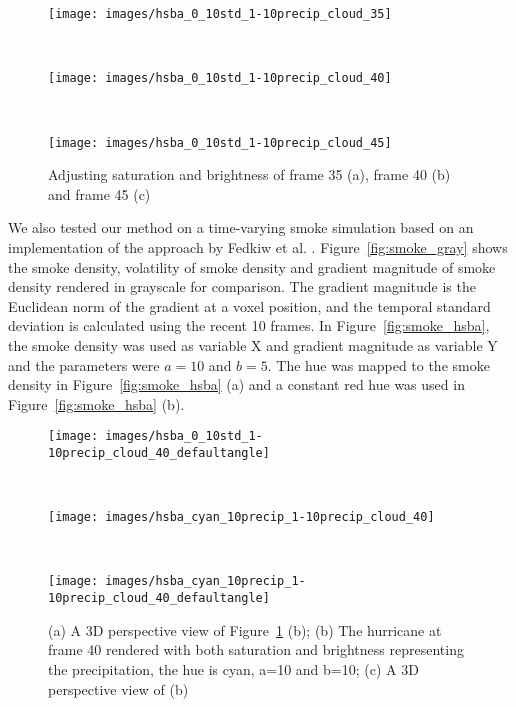 \begin{figure}
\centering
\begin{minipage}{.33\textwidth}
\texttt{[image: images/hsba\_0\_10std\_1-10precip\_cloud\_35]}
\subcaption{}
\end{minipage}~
\begin{minipage}{.33\textwidth}
\texttt{[image: images/hsba\_0\_10std\_1-10precip\_cloud\_40]}
\subcaption{}
\end{minipage}~
\begin{minipage}{.33\textwidth}
\texttt{[image: images/hsba\_0\_10std\_1-10precip\_cloud\_45]}
\subcaption{}
\end{minipage}
\caption{Adjusting saturation and brightness of frame 35 (a), frame 40 (b) and frame 45 (c)}
\label{fig:hurricane_hsba}
\end{figure}

We also tested our method on a time-varying smoke simulation based on an implementation of the approach by Fedkiw et al. \cite{fedkiw_visual_2001}. Figure~\ref{fig:smoke_gray} shows the smoke density, volatility of smoke density and gradient magnitude of smoke density rendered in grayscale for comparison.
The gradient magnitude is the Euclidean norm of the gradient at a voxel position,
and the temporal standard deviation is calculated using the recent 10 frames.
In Figure~\ref{fig:smoke_hsba}, the smoke density was used as variable X and gradient magnitude as variable Y and the parameters were $a=10$ and $b=5$.
The hue was mapped to the smoke density in Figure~\ref{fig:smoke_hsba} (a) and a constant red hue was used in Figure~\ref{fig:smoke_hsba} (b).

\begin{figure}
\centering
\begin{minipage}{.34\textwidth}
\texttt{[image: images/hsba\_0\_10std\_1-10precip\_cloud\_40\_defaultangle]}
\subcaption{}
\end{minipage}~
\begin{minipage}{.32\textwidth}
\texttt{[image: images/hsba\_cyan\_10precip\_1-10precip\_cloud\_40]}
\subcaption{}
\end{minipage}~
\begin{minipage}{.34\textwidth}
\texttt{[image: images/hsba\_cyan\_10precip\_1-10precip\_cloud\_40\_defaultangle]}
\subcaption{}
\end{minipage}
\caption[The hurricane at frame 40 rendered with both saturation and brightness representing the precipitation]{(a) A 3D perspective view of Figure~\ref{fig:hurricane_hsba} (b); (b) The hurricane at frame 40 rendered with both saturation and brightness representing the precipitation, the hue is cyan, a=10 and b=10; (c) A 3D perspective view of (b)}
\label{fig:hurricane_40_cyan}
\end{figure}

